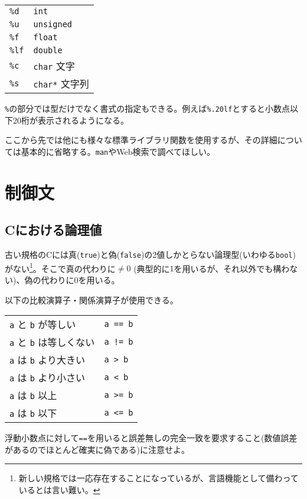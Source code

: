 \begin{table}[H]
    \centering
    \begin{tabular}{ll}
        \texttt{\%d}  & \texttt{int}          \\
        \texttt{\%u}  & \texttt{unsigned}     \\
        \texttt{\%f}  & \texttt{float}        \\
        \texttt{\%lf} & \texttt{double}       \\
        \texttt{\%c}  & \texttt{char} 文字    \\
        \texttt{\%s}  & \texttt{char*} 文字列
    \end{tabular}
\end{table}
\texttt{\%}の部分では型だけでなく書式の指定もできる。例えば\texttt{\%.20lf}とすると小数点以下20桁が表示されるようになる。

ここから先では他にも様々な標準ライブラリ関数を使用するが、その詳細については基本的に省略する。\texttt{man}やWeb検索で調べてほしい。

\section{制御文}
\subsection{Cにおける論理値}
古い規格のCには真(\texttt{true})と偽(\texttt{false})の2値しかとらない論理型(いわゆる\texttt{bool})がない\footnote{新しい規格では一応存在することになっているが、言語機能として備わっているとは言い難い。}。そこで真の代わりに\(\neq 0\) (典型的に\(1\)を用いるが、それ以外でも構わない)、偽の代わりに\(0\)を用いる。

以下の比較演算子・関係演算子が使用できる。
\begin{table}[H]
    \centering
    \begin{tabular}{ll}
        \texttt{a} と \texttt{b} が等しい     & \texttt{a == b} \\
        \texttt{a} と \texttt{b} は等しくない & \texttt{a != b} \\
        \texttt{a} は \texttt{b} より大きい   & \texttt{a > b}  \\
        \texttt{a} は \texttt{b} より小さい   & \texttt{a < b}  \\
        \texttt{a} は \texttt{b} 以上         & \texttt{a >= b} \\
        \texttt{a} は \texttt{b} 以下         & \texttt{a <= b}
    \end{tabular}
\end{table} \noindent
浮動小数点に対して\texttt{==}を用いると誤差無しの完全一致を要求すること(数値誤差があるのでほとんど確実に偽である)に注意せよ。

